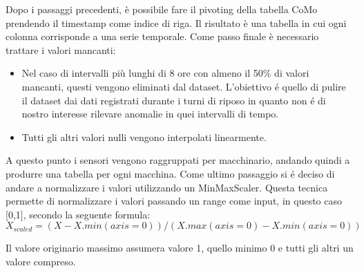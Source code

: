 Dopo i passaggi precedenti, è possibile fare il pivoting della tabella CoMo  prendendo il timestamp come indice di riga. Il risultato è una tabella in cui ogni colonna corrisponde a una serie temporale. 
Come passo finale è necessario trattare i valori mancanti:
\begin{itemize}
	\item Nel caso di intervalli più lunghi di 8 ore con almeno il 50\% di valori mancanti, questi vengono eliminati dal dataset. L'obiettivo é quello di pulire il dataset dai dati registrati durante i turni di riposo in quanto non é di nostro interesse rilevare anomalie in quei intervalli di tempo.
	\item Tutti gli altri valori nulli vengono interpolati linearmente.
\end{itemize}
A questo punto i sensori vengono raggruppati per macchinario, andando quindi a produrre una tabella per ogni macchina.
Come ultimo passaggio si é deciso di andare a normalizzare i valori utilizzando un MinMaxScaler. Questa tecnica permette di normalizzare i valori passando un range come input, in questo caso [0,1], secondo la seguente formula:
\[X_{scaled} = (X - X.min(axis=0)) / (X.max(axis=0) - X.min(axis=0))\]

Il valore originario massimo assumera valore 1, quello minimo 0 e tutti gli altri un valore compreso.